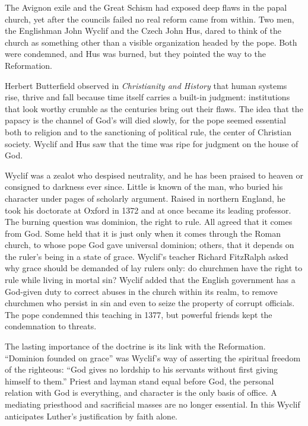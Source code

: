 
\begin{inbrief}
The Avignon exile and the Great Schism had exposed deep flaws in the papal church, yet after the
councils failed no real reform came from within. Two men, the Englishman John Wyclif and the Czech
John Hus, dared to think of the church as something other than a visible organization headed by the
pope. Both were condemned, and Hus was burned, but they pointed the way to the Reformation.
\end{inbrief}

Herbert Butterfield observed in \emph{Christianity and History} that human systems rise, thrive and
fall because time itself carries a built-in judgment: institutions that look worthy crumble as the
centuries bring out their flaws. The idea that the papacy is the channel of God's will died slowly,
for the pope seemed essential both to religion and to the sanctioning of political rule, the center
of Christian society. Wyclif and Hus saw that the time was ripe for judgment on the house of God.

Wyclif was a zealot who despised neutrality, and he has been praised to heaven or consigned to
darkness ever since. Little is known of the man, who buried his character under pages of scholarly
argument. Raised in northern England, he took his doctorate at Oxford in 1372 and at once became its
leading professor. The burning question was dominion, the right to rule. All agreed that it comes
from God. Some held that it is just only when it comes through the Roman church, to whose pope God
gave universal dominion; others, that it depends on the ruler's being in a state of grace. Wyclif's
teacher Richard FitzRalph asked why grace should be demanded of lay rulers only: do churchmen have
the right to rule while living in mortal sin? Wyclif added that the English government has a
God-given duty to correct abuses in the church within its realm, to remove churchmen who persist in
sin and even to seize the property of corrupt officials. The pope condemned this teaching in 1377,
but powerful friends kept the condemnation to threats.

The lasting importance of the doctrine is its link with the Reformation. ``Dominion founded on
grace'' was Wyclif's way of asserting the spiritual freedom of the righteous: ``God gives no lordship
to his servants without first giving himself to them.'' Priest and layman stand equal before God, the
personal relation with God is everything, and character is the only basis of office. A mediating
priesthood and sacrificial masses are no longer essential. In this Wyclif anticipates Luther's
justification by faith alone.

